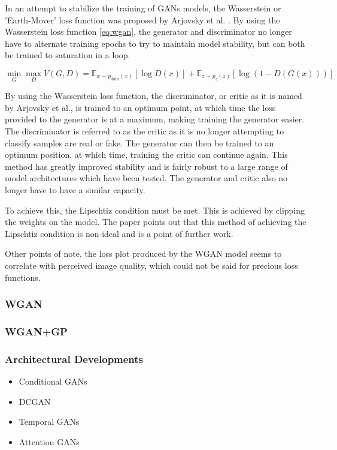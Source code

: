 \documentclass[12pt]{article}
\begin{document}
In an attempt to stabilize the training of GANs models, the Wasserstein or 'Earth-Mover' loss function was proposed by Arjovsky et al. \cite{Arjovsky2017}.
By using the Wasserstein loss function \ref{eq:wgan}, the generator and discriminator no longer have to alternate training epochs to try to maintain model stability, but can both be trained to saturation in a loop.

\begin{equation} \label{eq:wgan}
    \min_{G} \max_{D} V(G, D) = \mathbb{E}_{x \sim p_{data}(x)} [\log D(x)]
                              + \mathbb{E}_{z \sim p_{z}(z)} [\log (1 - D(G(x)))]
\end{equation}

\noindent By using the Wasserstein loss function, the discriminator, or critic as it is named by Arjovsky et al., is trained to an optimum point, at which time the loss provided to the generator is at a maximum, making training the generator easier.
The discriminator is referred to as the critic as it is no longer attempting to classify samples are real or fake.
The generator can then be trained to an optimum position, at which time, training the critic can continue again.
This method has greatly improved stability and is fairly robust to a large range of model architectures which have been tested.
The generator and critic also no longer have to have a similar capacity.

To achieve this, the Lipschtiz condition must be met.
This is achieved by clipping the weights on the model.
The paper points out that this method of achieving the Lipschtiz condition is non-ideal and is a point of further work.

Other points of note, the loss plot produced by the WGAN model seems to correlate with perceived image quality, which could not be said for precious loss functions.

\subsubsection{WGAN}
\subsubsection{WGAN+GP}

\subsubsection{Architectural Developments}
\begin{itemize}
    \item Conditional GANs
    \item DCGAN
    \item Temporal GANs
    \item Attention GANs
\end{itemize}
\end{document}
